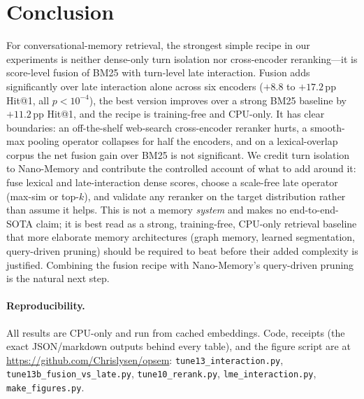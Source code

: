 \documentclass[10pt,twocolumn]{article}
\begin{document}
\section{Conclusion}
For conversational-memory retrieval, the strongest simple recipe in our
experiments is neither dense-only turn isolation nor cross-encoder
reranking---it is score-level fusion of BM25 with turn-level late interaction.
Fusion adds significantly over late interaction alone across six encoders
($+8.8$ to $+17.2$\,pp Hit@1, all $p<10^{-4}$), the best version improves over
a strong BM25 baseline by $+11.2$\,pp Hit@1, and the recipe is training-free
and CPU-only. It has clear boundaries: an off-the-shelf web-search cross-encoder
reranker hurts, a smooth-max pooling operator collapses for half the encoders,
and on a lexical-overlap corpus the net fusion gain over BM25 is not
significant. We credit turn isolation to Nano-Memory and contribute the
controlled account of what to add around it: fuse lexical and late-interaction
dense scores, choose a scale-free late operator (max-sim or top-$k$), and
validate any reranker on the target distribution rather than assume it helps. This is not a memory \emph{system}
and makes no end-to-end-SOTA claim; it is best read as a strong, training-free,
CPU-only retrieval baseline that more elaborate memory architectures (graph
memory, learned segmentation, query-driven pruning) should be required to beat
before their added complexity is justified. Combining the fusion recipe with
Nano-Memory's query-driven pruning is the natural next step.

\paragraph{Reproducibility.}
All results are CPU-only and run from cached embeddings. Code, receipts (the
exact JSON/markdown outputs behind every table), and the figure script are at
\url{https://github.com/Chrislysen/opsem}: \texttt{tune13\_interaction.py},
\texttt{tune13b\_fusion\_vs\_late.py}, \texttt{tune10\_rerank.py},
\texttt{lme\_interaction.py}, \texttt{make\_figures.py}.



\end{document}
